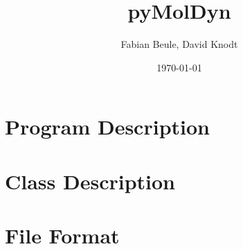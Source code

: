 \documentclass[final, oneside, a4paper, 11pt, pdftex, english]{scrreprt}
\begin{document}
\title{pyMolDyn}
\author{Fabian Beule, David Knodt}
\date{\today}
\maketitle

\tableofcontents


\chapter{Program Description}


\chapter{Class Description}






\chapter{File Format}

\end{document}
